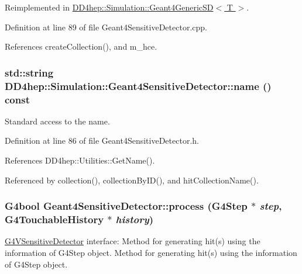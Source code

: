 Reimplemented in \hyperlink{class_d_d4hep_1_1_simulation_1_1_geant4_generic_s_d_a1e65440bc948eb7ba84792fcfdd002ed}{DD4hep::Simulation::Geant4GenericSD$<$ T $>$}.

Definition at line 89 of file Geant4SensitiveDetector.cpp.

References createCollection(), and m\_\-hce.\hypertarget{class_d_d4hep_1_1_simulation_1_1_geant4_sensitive_detector_a64cea03962fea7ef96ce5daa21652bdf}{
\subsubsection[{name}]{\setlength{\rightskip}{0pt plus 5cm}std::string DD4hep::Simulation::Geant4SensitiveDetector::name () const}}
\label{class_d_d4hep_1_1_simulation_1_1_geant4_sensitive_detector_a64cea03962fea7ef96ce5daa21652bdf}


Standard access to the name. 

Definition at line 86 of file Geant4SensitiveDetector.h.

References DD4hep::Utilities::GetName().

Referenced by collection(), collectionByID(), and hitCollectionName().\hypertarget{class_d_d4hep_1_1_simulation_1_1_geant4_sensitive_detector_aea5cd9b90bf1102dcf9e027f618cabe6}{
\subsubsection[{process}]{\setlength{\rightskip}{0pt plus 5cm}G4bool Geant4SensitiveDetector::process (G4Step $\ast$ {\em step}, \/  G4TouchableHistory $\ast$ {\em history})}}
\label{class_d_d4hep_1_1_simulation_1_1_geant4_sensitive_detector_aea5cd9b90bf1102dcf9e027f618cabe6}


\hyperlink{class_g4_v_sensitive_detector}{G4VSensitiveDetector} interface: Method for generating hit(s) using the information of G4Step object. Method for generating hit(s) using the information of G4Step object. 

